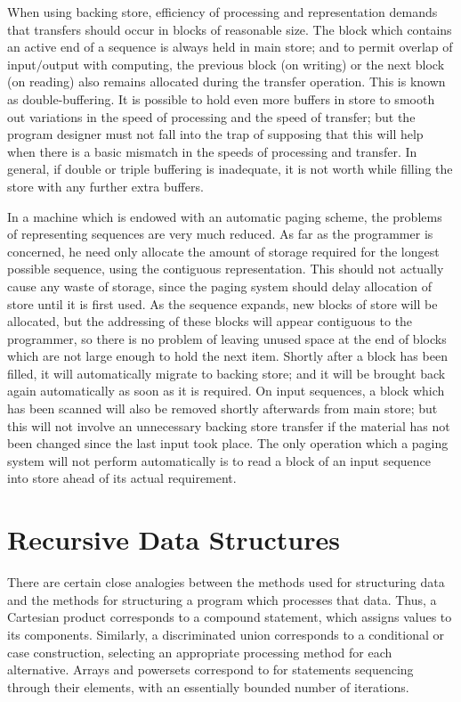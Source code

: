 When using backing store, efficiency of processing and representation demands that transfers should occur in blocks of reasonable size. The block which contains an active end of a sequence is always held in main store; and to permit overlap of input$/$output with computing, the previous block (on writing) or the next block (on reading) also remains allocated during the transfer operation. This is known as double-buffering. It is possible to hold even more buffers in store to smooth out variations in the speed of processing and the speed of transfer; but the program designer must not fall into the trap of supposing that this will help when there is a basic mismatch in the speeds of processing and transfer. In general, if double or triple buffering is inadequate, it is not worth while filling the store with any further extra buffers.

In a machine which is endowed with an automatic paging scheme, the problems of representing sequences are very much reduced. As far as the programmer is concerned, he need only allocate the amount of storage required for the longest possible sequence, using the contiguous representation. This should not actually cause any waste of storage, since the paging system should delay allocation of store until it is first used. As the sequence expands, new blocks of store will be allocated, but the addressing of these blocks will appear contiguous to the programmer, so there is no problem of leaving unused space at the end of blocks which are not large enough to hold the next item. Shortly after a block has been filled, it will automatically migrate to backing store; and it will be brought back again automatically as soon as it is required. On input sequences, a block which has been scanned will also be removed shortly afterwards from main store; but this will not involve an unnecessary backing store transfer if the material has not been changed since the last input took place. The only operation which a paging system will not perform automatically is to read a block of an input sequence into store ahead of its actual requirement.

\section[Recursive data structures]{Recursive Data Structures}

There are certain close analogies between the methods used for structuring data and the methods for structuring a program which processes that data. Thus, a Cartesian product corresponds to a compound statement, which assigns values to its components. Similarly, a discriminated union corresponds to a conditional or case construction, selecting an appropriate processing method for each alternative. Arrays and powersets correspond to for statements sequencing through their elements, with an essentially bounded number of iterations.

